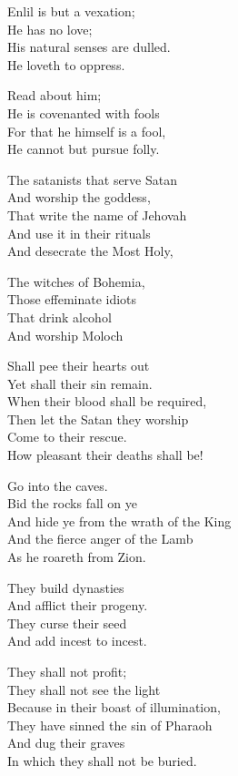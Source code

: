 \documentclass[
]{book}
\begin{document}
Enlil is but a vexation;\\
He has no love;\\
His natural senses are dulled.\\
He loveth to oppress.

Read about him;\\
He is covenanted with fools\\
For that he himself is a fool,\\
He cannot but pursue folly.

The satanists that serve Satan\\
And worship the goddess,\\
That write the name of Jehovah\\
And use it in their rituals\\
And desecrate the Most Holy,

The witches of Bohemia,\\
Those effeminate idiots\\
That drink alcohol\\
And worship Moloch

Shall pee their hearts out\\
Yet shall their sin remain.\\
When their blood shall be required,\\
Then let the Satan they worship\\
Come to their rescue.\\
How pleasant their deaths shall be!

Go into the caves.\\
Bid the rocks fall on ye\\
And hide ye from the wrath of the King\\
And the fierce anger of the Lamb\\
As he roareth from Zion.

They build dynasties\\
And afflict their progeny.\\
They curse their seed\\
And add incest to incest.

They shall not profit;\\
They shall not see the light\\
Because in their boast of illumination,\\
They have sinned the sin of Pharaoh\\
And dug their graves\\
In which they shall not be buried.
\end{document}
